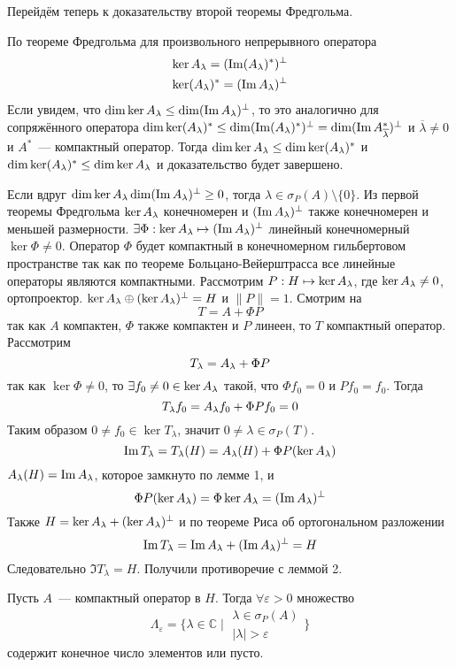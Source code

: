\documentclass[14pt]{extarticle}
\begin{document}
Перейдём теперь к доказательству второй теоремы Фредгольма.
\begin{Proof}
    По теореме Фредгольма для произвольного непрерывного оператора 
    \begin{gather*}
        \ker A_\lambda = (\operatorname{Im} (A_\lambda)^*)^\perp\\
        \ker (A_\lambda)^* = (\operatorname{Im} A_\lambda)^\perp
    \end{gather*}
    Если увидем, что $\dim \ker A_\lambda \le \dim (\operatorname{Im} A_\lambda)^\perp$, то это 
    аналогично для сопряжённого оператора $\dim \ker (A_\lambda)^* \le \dim (\operatorname{Im}(A_\lambda
    )^*)^\perp = \dim (\operatorname{Im} A^*_{\overline{\lambda}})^\perp$ и $
    \overline{\lambda} \ne 0$ и $A^*$~--- компактный оператор.
    Тогда $\dim \ker A_\lambda \le \dim \ker (A_\lambda)^*$ и $\dim \ker (A_\lambda)^* \le \dim 
    \ker A_\lambda$ и доказательство будет завершено.
    
    Если вдруг $\dim \ker A_\lambda  \dim (\operatorname{Im} A_\lambda)^\perp \ge 0$, тогда
    $\lambda \in \sigma_P(A) \setminus \{0\}$.
    Из первой теоремы Фредгольма $\ker A_\lambda$ конечномерен и $(\operatorname{Im} A_\lambda)^\perp$
    также конечномерен и меньшей размерности.
    $\exists \Phi : \ker A_\lambda \mapsto (\operatorname{Im} A_\lambda)^\perp$ линейный конечномерный
    $\ker \Phi \ne 0$.
    Оператор $\Phi$ будет компактный в конечномерном гильбертовом пространстве
    так как по теореме Больцано-Вейерштрасса все линейные операторы являются
    компактными.
    Рассмотрим $P : H \mapsto \ker A_\lambda$, где $\ker A_\lambda \ne 0$, ортопроектор.
    $\ker A_\lambda \oplus (\ker A_\lambda)^\perp = H$ и $\|P\| = 1$.
    Смотрим на
    $$
    T = A + \Phi P
    $$
    так как $A$ компактен, $\Phi$ также компактен и $P$ линеен, то $T$ 
    компактный оператор.
    Рассмотрим
    $$
    T_\lambda = A_\lambda + \Phi P
    $$
    так как $\ker \Phi \ne 0$, то $\exists f_0 \ne 0 \in \ker A_\lambda$ такой, что
    $\Phi f_0 = 0$ и $P f_0 = f_0$.
    Тогда
    $$
    T_\lambda f_0 = A_\lambda f_0 + \Phi P f_0 = 0
    $$
    Таким образом $0 \ne f_0 \in \ker T_\lambda$, значит $0 \ne \lambda \in 
    \sigma_P(T)$.
    $$
    \operatorname{Im} T_\lambda = T_\lambda(H) = A_\lambda(H) + \Phi P(\ker A_\lambda)
    $$
    $A_\lambda(H) = \operatorname{Im} A_\lambda$, которое замкнуто по лемме 1, и
    $$
    \Phi P(\ker A_\lambda) = \Phi \ker A_\lambda = (\operatorname{Im} A_\lambda)^\perp
    $$
    Также $H = \ker A_\lambda + (\ker A_\lambda)^\perp$ и по теореме Риса об ортогональном
    разложении
    $$
    \operatorname{Im} T_\lambda = \operatorname{Im} A_\lambda + (\operatorname{Im} A_\lambda)^\perp = H
    $$
    Следовательно $\Im T_\lambda = H$.
    Получили противоречие с леммой 2.
\end{Proof}
\begin{Theor}
    Пусть $A$~--- компактный оператор в $H$.
    Тогда $\forall \varepsilon > 0$ множество
    $$
    \Lambda_\varepsilon = \{\lambda \in \mathbb{C}\mid
    \begin{array}{l}
        \lambda \in \sigma_P(A)\\
        |\lambda| > \varepsilon    
    \end{array}
    \}
    $$
    содержит конечное число элементов или пусто.
\end{Theor}
\end{document}
